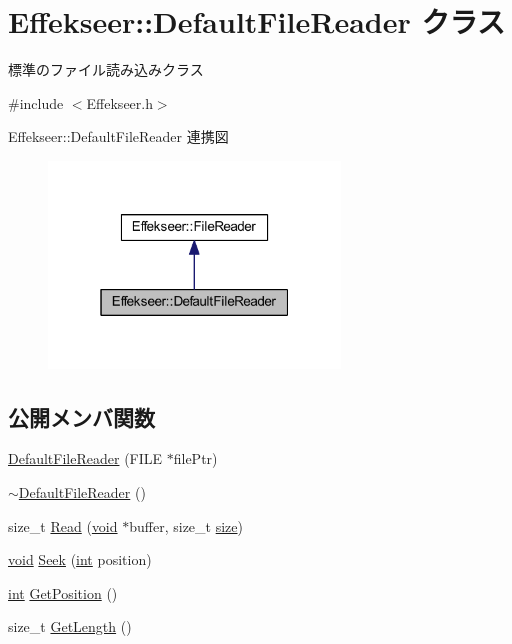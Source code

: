\hypertarget{class_effekseer_1_1_default_file_reader}{}\section{Effekseer\+:\+:Default\+File\+Reader クラス}
\label{class_effekseer_1_1_default_file_reader}


標準のファイル読み込みクラス  




{\ttfamily \#include $<$Effekseer.\+h$>$}



Effekseer\+:\+:Default\+File\+Reader 連携図\nopagebreak
\begin{figure}[H]
\begin{center}
\leavevmode
\includegraphics[width=220pt]{class_effekseer_1_1_default_file_reader__coll__graph}
\end{center}
\end{figure}
\subsection*{公開メンバ関数}
\begin{DoxyCompactItemize}
\item 
\mbox{\hyperlink{class_effekseer_1_1_default_file_reader_ad8f7324f6217658c9f3ec1c6db5f9e6b}{Default\+File\+Reader}} (F\+I\+LE $\ast$file\+Ptr)
\item 
\mbox{\hyperlink{class_effekseer_1_1_default_file_reader_adcc437133a5e54acf884fd867d243c96}{$\sim$\+Default\+File\+Reader}} ()
\item 
size\+\_\+t \mbox{\hyperlink{class_effekseer_1_1_default_file_reader_ae00fd8b1031e13bd5a43d74f03d7ed79}{Read}} (\mbox{\hyperlink{namespace_effekseer_ab34c4088e512200cf4c2716f168deb56}{void}} $\ast$buffer, size\+\_\+t \mbox{\hyperlink{namespace_effekseer_a73c68f3d33539d30844b9d1e058077f7}{size}})
\item 
\mbox{\hyperlink{namespace_effekseer_ab34c4088e512200cf4c2716f168deb56}{void}} \mbox{\hyperlink{class_effekseer_1_1_default_file_reader_a9c9e821e4508708a2c91a9ab486b2709}{Seek}} (\mbox{\hyperlink{namespace_effekseer_ace0abf7c2e6947e519ebe8b54cbcc30a}{int}} position)
\item 
\mbox{\hyperlink{namespace_effekseer_ace0abf7c2e6947e519ebe8b54cbcc30a}{int}} \mbox{\hyperlink{class_effekseer_1_1_default_file_reader_a86001f21782b7cb40a5e0ca4ee155aca}{Get\+Position}} ()
\item 
size\+\_\+t \mbox{\hyperlink{class_effekseer_1_1_default_file_reader_a2663a6f3b6bf3aaabadcfe371a85b15d}{Get\+Length}} ()
\end{DoxyCompactItemize}
